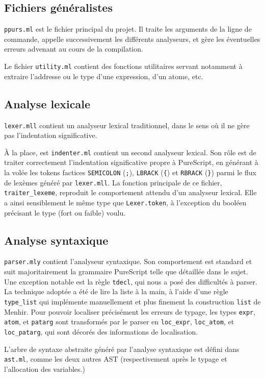 \documentclass[12pt,a4paper]{article}
\begin{document}
\subsection{Fichiers généralistes}
\texttt{ppurs.ml} est le fichier principal du projet. Il traite les arguments de la ligne de commande, appelle successivement les différents analyseurs, et gère les éventuelles erreurs advenant au cours de la compilation.

Le fichier \texttt{utility.ml} contient des fonctions utilitaires servant notamment à extraire l'addresse ou le type d'une expression, d'un atome, etc.

\subsection{Analyse lexicale}
\texttt{lexer.mll} contient un analyseur lexical traditionnel, dans le sens où il ne gère pas l'indentation significative. 

À la place, est \texttt{indenter.ml} contient un second analyseur lexical. 
Son rôle est de traiter correctement l'indentation significative propre à PureScript, en générant à la volée les tokens factices \texttt{SEMICOLON} (\texttt{;}), \texttt{LBRACK} (\texttt{\{}) et \texttt{RBRACK} (\texttt{\}}) parmi le flux de lexèmes généré par \texttt{lexer.mll}.
La fonction principale de ce fichier, \texttt{traiter\_lexeme}, reproduit le comportement attendu d'un analyseur lexical.
Elle a ainsi sensiblement le même type que \texttt{Lexer.token}, à l'exception du booléen précisant le type (fort ou faible) voulu.

\subsection{Analyse syntaxique}
\texttt{parser.mly} contient l'analyseur syntaxique. Son comportement est standard et suit majoritairement la grammaire PureScript telle que détaillée dans le sujet. Une exception notable est la règle \texttt{tdecl}, qui nous a posé des difficultés à parser. La technique adoptée a été de lire la liste à la main, à l'aide d'une règle \texttt{type\_list} qui implémente manuellement et plus finement la construction \texttt{list} de Menhir. Pour pouvoir localiser précisément les erreurs de typage, les types \texttt{expr}, \texttt{atom}, et \texttt{patarg} sont transformés par le parser en \texttt{loc\_expr}, \texttt{loc\_atom}, et \texttt{loc\_patarg}, qui sont décorés des informations de localisation.

L'arbre de syntaxe abstraite généré par l'analyse syntaxique est défini dans \texttt{ast.ml}, comme les deux autres AST (respectivement après le typage et l'allocation des variables.)
\end{document}
